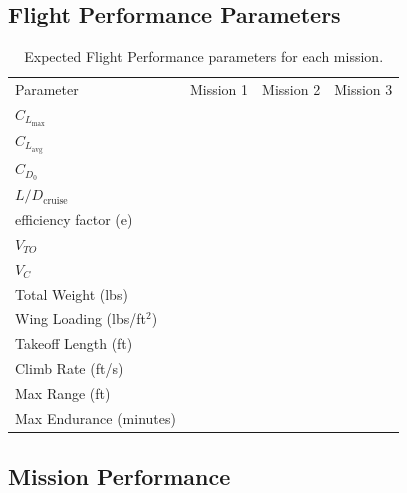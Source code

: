 \documentclass[report]{byu-aero}
\begin{document}
\subsection{Flight Performance Parameters}
\label{ssec:flightperformanceparams}

\begin{table}[h!]
	\centering
	\caption{Expected Flight Performance parameters for each mission.}
	\label{tab:expectedflightperformance}
	\begin{tabular}{ C{1.5in}  C{1in}  C{1in}  C{1in}}
		
		Parameter & Mission 1 & Mission 2 & Mission 3 \\
		
		\(C_{L_\text{max}}\) & & &\\
		
		\(C_{L_\text{avg}}\) & & &\\
		
		\(C_{D_0}\) & & &\\
		
		\(L/D_\text{cruise}\) & & &\\
		
		efficiency factor (e) & & & \\
		
		\(V_{TO}\) & & & \\
		
		\(V_C\) & & & \\
		
		Total Weight (lbs) & & &\\
		
		Wing Loading (lbs/ft\(^2\)) & & &\\
		
		Takeoff Length (ft) & & & \\
		
		Climb Rate (ft/s) & & &  \\
		
		Max Range (ft) & & & \\
		
		Max Endurance (minutes) & & & \\
		
	\end{tabular}
\end{table}


\subsection{Mission Performance}
\label{ssec:missionperformance}
\end{document}
